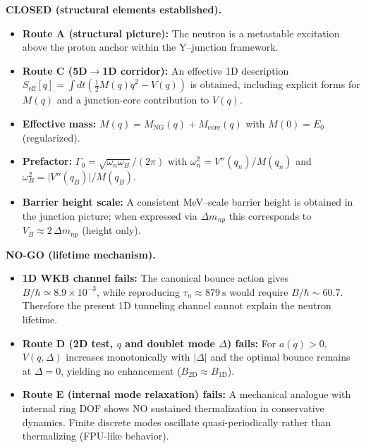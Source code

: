 \begin{tcolorbox}[title={Neutron: Status Summary (Routes A--E)}, colback=black!2, colframe=black!35, boxrule=0.6pt]
\small

\textbf{CLOSED (structural elements established).}
\begin{itemize}\setlength\itemsep{0.2em}
  \item \textbf{Route A (structural picture):} The neutron is a metastable excitation above the proton anchor within the Y--junction framework. \tagDc{}
  \item \textbf{Route C (5D$\to$1D corridor):} An effective 1D description $S_{\mathrm{eff}}[q]=\int dt\left(\tfrac12 M(q)\dot q^2 - V(q)\right)$ is obtained, including explicit forms for $M(q)$ and a junction-core contribution to $V(q)$. \tagDc{}
  \item \textbf{Effective mass:} $M(q)=M_{\mathrm{NG}}(q)+M_{\mathrm{core}}(q)$ with $M(0)=E_0$ (regularized). \tagDc{}
  \item \textbf{Prefactor:} $\Gamma_0=\sqrt{\omega_n\omega_B}/(2\pi)$ with $\omega_n^2=V''(q_n)/M(q_n)$ and $\omega_B^2=\lvert V''(q_B)\rvert/M(q_B)$. \tagDc{}
  \item \textbf{Barrier height scale:} A consistent MeV--scale barrier height is obtained in the junction picture; when expressed via $\Delta m_{np}$ this corresponds to $V_B \approx 2\,\Delta m_{np}$ (height only). \tagDc{}
\end{itemize}

\medskip
\textbf{NO-GO (lifetime mechanism).}
\begin{itemize}\setlength\itemsep{0.2em}
  \item \textbf{1D WKB channel fails:} The canonical bounce action gives $B/\hbar \simeq 8.9\times 10^{-3}$, while reproducing $\tau_n\approx 879~\mathrm{s}$ would require $B/\hbar\sim 60.7$. Therefore the present 1D tunneling channel cannot explain the neutron lifetime. \tagNoGo{}
  \item \textbf{Route D (2D test, $q$ and doublet mode $\Delta$) fails:} For $a(q)>0$, $V(q,\Delta)$ increases monotonically with $\lvert\Delta\rvert$ and the optimal bounce remains at $\Delta=0$, yielding no enhancement ($B_{2\mathrm{D}}\approx B_{1\mathrm{D}}$). \tagNoGo{}
  \item \textbf{Route E (internal mode relaxation) fails:} A mechanical analogue with internal ring DOF shows NO sustained thermalization in conservative dynamics. Finite discrete modes oscillate quasi-periodically rather than thermalizing (FPU-like behavior). \tagNoGo{}
\end{itemize}


\end{tcolorbox}

